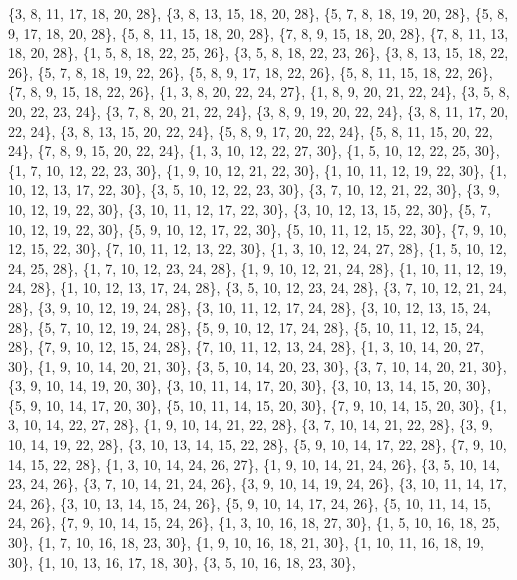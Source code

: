 \documentclass[11pt,a4paper]{article}
\begin{document}
{\{3, 8, 11, 17, 18, 20, 28\}, \{3, 8, 13, 15, 18, 20, 28\}, \{5, 7, 8, 18, 19, 20, 28\}, \{5, 8, 9, 17, 18, 20, 28\}, \{5, 8, 11, 15, 18, 20, 28\},
\{7, 8, 9, 15, 18, 20, 28\}, \{7, 8, 11, 13, 18, 20, 28\}, \{1, 5, 8, 18, 22, 25, 26\}, \{3, 5, 8, 18, 22, 23, 26\}, \{3, 8, 13, 15, 18, 22, 26\},
\{5, 7, 8, 18, 19, 22, 26\}, \{5, 8, 9, 17, 18, 22, 26\}, \{5, 8, 11, 15, 18, 22, 26\}, \{7, 8, 9, 15, 18, 22, 26\}, \{1, 3, 8, 20, 22, 24, 27\},
\{1, 8, 9, 20, 21, 22, 24\}, \{3, 5, 8, 20, 22, 23, 24\}, \{3, 7, 8, 20, 21, 22, 24\}, \{3, 8, 9, 19, 20, 22, 24\}, \{3, 8, 11, 17, 20, 22, 24\},
\{3, 8, 13, 15, 20, 22, 24\}, \{5, 8, 9, 17, 20, 22, 24\}, \{5, 8, 11, 15, 20, 22, 24\}, \{7, 8, 9, 15, 20, 22, 24\}, \{1, 3, 10, 12, 22, 27, 30\},
\{1, 5, 10, 12, 22, 25, 30\}, \{1, 7, 10, 12, 22, 23, 30\}, \{1, 9, 10, 12, 21, 22, 30\}, \{1, 10, 11, 12, 19, 22, 30\}, \{1, 10, 12, 13, 17, 22, 30\},
\{3, 5, 10, 12, 22, 23, 30\}, \{3, 7, 10, 12, 21, 22, 30\}, \{3, 9, 10, 12, 19, 22, 30\}, \{3, 10, 11, 12, 17, 22, 30\}, \{3, 10, 12, 13, 15, 22, 30\},
\{5, 7, 10, 12, 19, 22, 30\}, \{5, 9, 10, 12, 17, 22, 30\}, \{5, 10, 11, 12, 15, 22, 30\}, \{7, 9, 10, 12, 15, 22, 30\}, \{7, 10, 11, 12, 13, 22, 30\},
\{1, 3, 10, 12, 24, 27, 28\}, \{1, 5, 10, 12, 24, 25, 28\}, \{1, 7, 10, 12, 23, 24, 28\}, \{1, 9, 10, 12, 21, 24, 28\}, \{1, 10, 11, 12, 19, 24, 28\},
\{1, 10, 12, 13, 17, 24, 28\}, \{3, 5, 10, 12, 23, 24, 28\}, \{3, 7, 10, 12, 21, 24, 28\}, \{3, 9, 10, 12, 19, 24, 28\}, \{3, 10, 11, 12, 17, 24, 28\},
\{3, 10, 12, 13, 15, 24, 28\}, \{5, 7, 10, 12, 19, 24, 28\}, \{5, 9, 10, 12, 17, 24, 28\}, \{5, 10, 11, 12, 15, 24, 28\}, \{7, 9, 10, 12, 15, 24, 28\},
\{7, 10, 11, 12, 13, 24, 28\}, \{1, 3, 10, 14, 20, 27, 30\}, \{1, 9, 10, 14, 20, 21, 30\}, \{3, 5, 10, 14, 20, 23, 30\}, \{3, 7, 10, 14, 20, 21, 30\},
\{3, 9, 10, 14, 19, 20, 30\}, \{3, 10, 11, 14, 17, 20, 30\}, \{3, 10, 13, 14, 15, 20, 30\}, \{5, 9, 10, 14, 17, 20, 30\}, \{5, 10, 11, 14, 15, 20, 30\},
\{7, 9, 10, 14, 15, 20, 30\}, \{1, 3, 10, 14, 22, 27, 28\}, \{1, 9, 10, 14, 21, 22, 28\}, \{3, 7, 10, 14, 21, 22, 28\}, \{3, 9, 10, 14, 19, 22, 28\},
\{3, 10, 13, 14, 15, 22, 28\}, \{5, 9, 10, 14, 17, 22, 28\}, \{7, 9, 10, 14, 15, 22, 28\}, \{1, 3, 10, 14, 24, 26, 27\}, \{1, 9, 10, 14, 21, 24, 26\},
\{3, 5, 10, 14, 23, 24, 26\}, \{3, 7, 10, 14, 21, 24, 26\}, \{3, 9, 10, 14, 19, 24, 26\}, \{3, 10, 11, 14, 17, 24, 26\}, \{3, 10, 13, 14, 15, 24, 26\},
\{5, 9, 10, 14, 17, 24, 26\}, \{5, 10, 11, 14, 15, 24, 26\}, \{7, 9, 10, 14, 15, 24, 26\}, \{1, 3, 10, 16, 18, 27, 30\}, \{1, 5, 10, 16, 18, 25, 30\},
\{1, 7, 10, 16, 18, 23, 30\}, \{1, 9, 10, 16, 18, 21, 30\}, \{1, 10, 11, 16, 18, 19, 30\}, \{1, 10, 13, 16, 17, 18, 30\}, \{3, 5, 10, 16, 18, 23, 30\},
}
\end{document}
